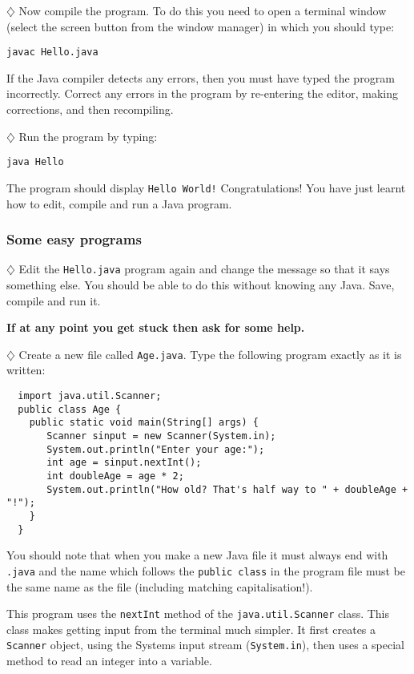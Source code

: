 $\diamondsuit$ 
Now compile the program. To do this you need to open a terminal window 
(select the screen button from the window manager) in which you should type: 

{\tt javac Hello.java} 

If the Java compiler detects any errors, then you must have
typed the program incorrectly. Correct any errors in the program
by re-entering the editor, making corrections, and then
recompiling. 

$\diamondsuit$ 
Run the program by typing: 

{\tt java Hello} 

The program should display {\tt Hello World!} Congratulations!
You have just learnt how to edit, compile and run a Java
program.

\subsubsection{Some easy programs}

$\diamondsuit$ 
Edit the {\tt Hello.java} program again and change the message
so that it says something else. You should be able to do this
without knowing any Java. Save, compile and run it. 

{\bf If at any point you get stuck then ask for some help.}

$\diamondsuit$ 
Create a new file called {\tt Age.java}. Type the following
program exactly as it is written:

\begin{verbatim}
  import java.util.Scanner;
  public class Age { 
    public static void main(String[] args) {
       Scanner sinput = new Scanner(System.in);
       System.out.println("Enter your age:");
       int age = sinput.nextInt();
       int doubleAge = age * 2;
       System.out.println("How old? That's half way to " + doubleAge + "!");
    }
  }
\end{verbatim}
 
You should note that when you make a new Java file it must
always end with {\tt .java} and the name which follows the {\tt public 
class} in the program file must be the same name as the file (including 
matching capitalisation!). 

This program uses the {\tt nextInt} method of the
{\tt java.util.Scanner} class. This class makes getting input from the 
terminal much simpler. It first creates a {\tt Scanner} object, using the 
Systems input stream ({\tt System.in}), then uses a special method to read
an integer into a variable.

